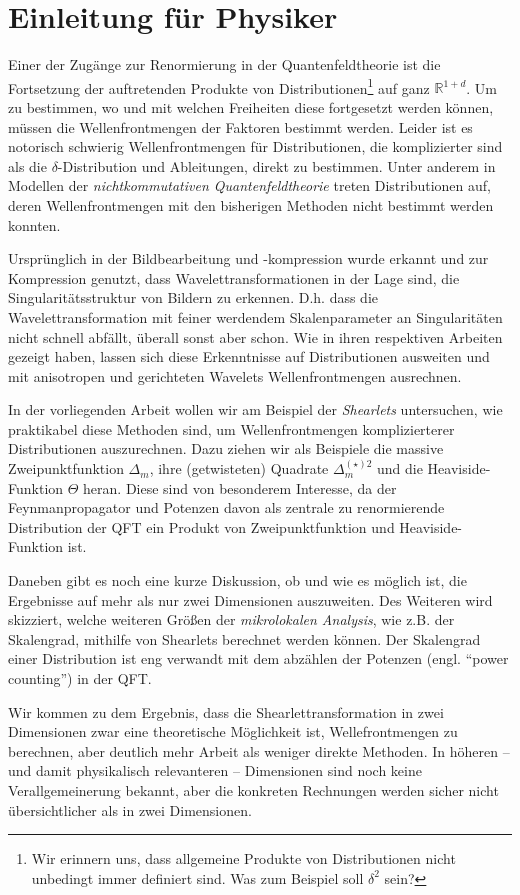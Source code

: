 
\chapter{Einleitung für Physiker} %
\label{sec:einleitung_physics}
Einer der Zugänge zur Renormierung in der Quantenfeldtheorie ist die Fortsetzung der auftretenden Produkte von Distributionen\footnote{Wir erinnern uns, dass allgemeine Produkte von Distributionen nicht unbedingt immer definiert sind. Was zum Beispiel soll \(\delta^2\) sein?} auf ganz $\mathbb{R}^{1+d}$. Um zu bestimmen, wo und mit welchen Freiheiten diese fortgesetzt werden können, müssen die Wellenfrontmengen der Faktoren bestimmt werden. Leider ist es notorisch schwierig Wellenfrontmengen für Distributionen, die komplizierter sind als die $\delta$-Distribution und Ableitungen, direkt zu bestimmen. Unter anderem in Modellen der \emph{nichtkommutativen Quantenfeldtheorie} \cite{kappaMinkowski,Doplicher1995,StringLocalized} treten Distributionen auf, deren Wellenfrontmengen mit den bisherigen Methoden nicht bestimmt werden konnten.

Ursprünglich in der Bildbearbeitung und -kompression wurde erkannt und zur Kompression genutzt, dass Wavelettransformationen in der Lage sind, die Singularitätsstruktur von Bildern zu erkennen. D.h. dass die Wavelettransformation mit feiner werdendem Skalenparameter an Singularitäten nicht schnell abfällt, überall sonst aber schon.
Wie \textcite{Kutyniok2008,Candes2005,Contourlets} in ihren respektiven Arbeiten gezeigt haben, lassen sich diese Erkenntnisse auf Distributionen ausweiten und mit anisotropen und gerichteten Wavelets Wellenfrontmengen ausrechnen.

In der vorliegenden Arbeit wollen wir am Beispiel der \emph{Shearlets} untersuchen, wie praktikabel diese Methoden sind, um Wellenfrontmengen komplizierterer Distributionen auszurechnen. Dazu ziehen wir als Beispiele die massive Zweipunktfunktion \(\Delta_m\), ihre (getwisteten) Quadrate \(\Delta_m^{(\star) 2}\) und die Heaviside-Funktion \(\Theta\) heran. Diese sind von besonderem Interesse, da der Feynmanpropagator und Potenzen davon als zentrale zu renormierende Distribution der QFT ein Produkt von Zweipunktfunktion und Heaviside-Funktion ist.

Daneben gibt es noch eine kurze Diskussion, ob und wie es möglich ist, die Ergebnisse auf mehr als nur zwei Dimensionen auszuweiten.
Des Weiteren wird skizziert, welche weiteren Größen der \emph{mikrolokalen Analysis}, wie z.B. der Skalengrad, mithilfe von Shearlets berechnet werden können. Der Skalengrad einer Distribution ist eng verwandt mit dem abzählen der Potenzen (engl. "`power counting"') in der QFT.

Wir kommen zu dem Ergebnis, dass die Shearlettransformation in zwei Dimensionen zwar eine theoretische Möglichkeit ist, Wellefrontmengen zu berechnen, aber deutlich mehr Arbeit als weniger direkte Methoden. In höheren -- und damit physikalisch relevanteren -- Dimensionen sind noch keine Verallgemeinerung bekannt, aber die konkreten Rechnungen werden sicher nicht übersichtlicher als in zwei Dimensionen.


